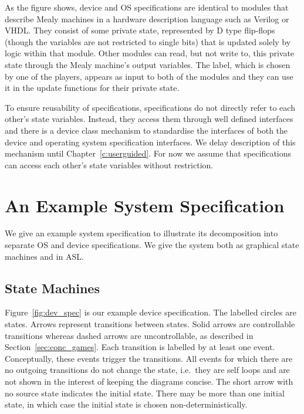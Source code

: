 As the figure shows, device and OS specifications are identical to modules that describe Mealy machines in a hardware description language such as Verilog or VHDL\@. They consist of some private state, represented by D type flip-flops (though the variables are not restricted to single bits) that is updated solely by logic within that module. Other modules can read, but not write to, this private state through the Mealy machine's output variables. The label, which is chosen by one of the players, appears as input to both of the modules and they can use it in the update functions for their private state.

To ensure reusability of specifications, specifications do not directly refer to each other's state variables. Instead, they access them through well defined interfaces and there is a device class mechanism to standardise the interfaces of both the device and operating system specification interfaces. We delay description of this mechanism until Chapter~\ref{c:userguided}. For now we assume that specifications can access each other's state variables without restriction.

\section{An Example System Specification}

We give an example system specification to illustrate its decomposition into separate OS and device specifications. We give the system both as graphical state machines and in ASL.

\subsection{State Machines}

Figure~\ref{fig:dev_spec} is our example device specification. The labelled circles are states. Arrows represent transitions between states. Solid arrows are controllable transitions whereas dashed arrows are uncontrollable, as described in Section~\ref{sec:conc_games}. Each transition is labelled by at least one event. Conceptually, these events trigger the transitions. All events for which there are no outgoing transitions do not change the state, i.e.\ they are self loops and are not shown in the interest of keeping the diagrams concise. The short arrow with no source state indicates the initial state. There may be more than one initial state, in which case the initial state is chosen non-deterministically.

